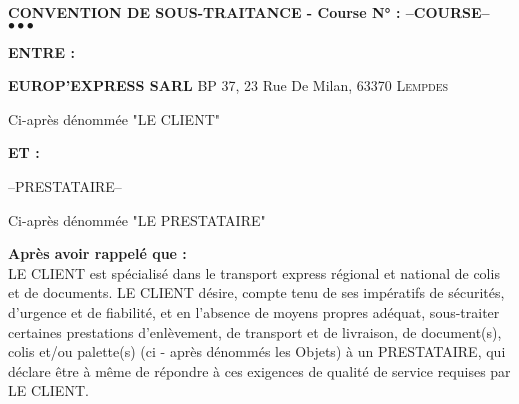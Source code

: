 \documentclass[a4paper, oneside, 8pt, french]{article}
\begin{document}
\begin{center}
\large \bf CONVENTION DE SOUS-TRAITANCE - Course N° : --COURSE-- \\
\textcolor{Symeos_Red}{$\bullet \bullet$}\textcolor{Symeos_Grey}{$\bullet$}\\
\end{center}

\begin{fminipage}
\begin{minipage}[t]{0.10\textwidth}
\textbf{ENTRE :} 
\end{minipage}
\hspace{2mm}
\begin{minipage}[t]{0.88\textwidth}
\textbf{EUROP'EXPRESS SARL} \hspace{0.5cm} BP 37, 23 Rue De Milan, \textsc{63370 Lempdes}
\vspace{-10px}
\begin{flushright}
{\small Ci-après dénommée "LE CLIENT"}
\end{flushright}
\end{minipage}

\begin{minipage}[t]{0.10\textwidth}\textbf 
\textbf{ET :} 
\end{minipage}
\hspace{2mm}
\begin{minipage}[t]{0.89\textwidth}
--PRESTATAIRE--
\vspace{-10px}
\begin{flushright}
{\small Ci-après dénommée "LE PRESTATAIRE"}
\end{flushright}
\end{minipage}
\end{fminipage}

\textbf {Après avoir rappelé que :}\\
LE CLIENT  est spécialisé dans le transport express régional et national de colis et de documents. LE CLIENT désire, compte tenu de ses  impératifs de sécurités, d'urgence et de fiabilité, et en l'absence de moyens propres adéquat, sous-traiter certaines prestations d'enlèvement, de transport et de livraison, de document(s), colis et/ou palette(s) (ci - après dénommés les Objets) à un PRESTATAIRE, qui déclare être à même de répondre à ces exigences de qualité de service requises par LE CLIENT.
\end{document}
